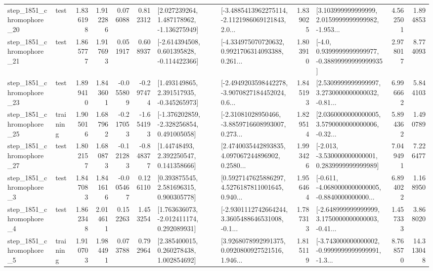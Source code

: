 \begin{tabular}{llrrrrllrlrr}
 step\_1851\_chromophore\_20 &      test &      1.836198 &    1.912286 &      0.076088 &  0.812312 &    [2.027239264, 1.487178962, -1.136275949] &  [-3.4885413962275114, -2.1121986069121843, 2.0... &       1.839025 &  [3.103999999999999, 2.0159999999999982, -1.953... &            4.562501 &          1.894853 \\
 step\_1851\_chromophore\_21 &      test &      1.865777 &    1.917693 &      0.051917 &  0.608937 &   [-2.614394508, 0.601395828, -0.114422366] &  [-4.334975070720632, 0.9921706314093388, 0.261... &       1.803910 &   [-4.0, 0.9399999999999977, -0.38899999999999935] &            2.978017 &          8.774093 \\
 step\_1851\_chromophore\_23 &      test &      1.899410 &    1.843601 &     -0.055809 & -0.297474 &    [1.493149865, 2.391517935, -0.345265973] &  [-2.4949203598442278, -3.9070827184452024, 0.6... &       1.845193 &  [2.5309999999999997, 3.2730000000000032, -0.81... &            6.996662 &          5.844103 \\
 step\_1851\_chromophore\_25 &  training &      1.905016 &    1.687962 &     -0.217053 & -1.654193 &   [-1.376202859, -2.328256854, 0.491005058] &  [-2.31081028950466, -3.8859716608993007, 0.273... &       1.829514 &  [2.0360000000000005, 3.5790000000000006, -0.32... &            5.894362 &          1.490789 \\
 step\_1851\_chromophore\_27 &      test &      1.802157 &    1.680873 &     -0.121283 & -0.848377 &      [1.44748493, 2.392250547, 0.141358666] &  [2.4740035442893835, 4.097067244896902, 0.2580... &       1.993426 &   [-2.013, -3.530000000000001, 0.2839999999999989] &            7.049491 &          7.226477 \\
  step\_1851\_chromophore\_3 &      test &      1.847083 &    1.841616 &     -0.005467 &  0.126110 &     [0.393875545, 2.581696315, 0.900305778] &  [0.5927147625886297, 4.5276187811001645, 0.940... &       1.956464 &  [-0.611, -4.0680000000000005, -0.8840000000000... &            6.894022 &          1.168950 \\
  step\_1851\_chromophore\_4 &      test &      1.862348 &    2.014611 &      0.152263 &  1.453254 &    [1.763636073, -2.012411174, 0.292089931] &  [-2.9301112742664244, 3.3605488646531008, -0.1... &       1.787313 &  [-2.648999999999999, 3.1750000000000003, -0.41... &            1.457333 &          3.868020 \\
  step\_1851\_chromophore\_5 &  training &      1.910703 &    1.984491 &      0.073788 &  0.792964 &     [2.385400015, 0.260278438, 1.002854692] &  [3.9268078992991375, 0.0920800927521516, 1.946... &       1.815119 &  [-3.743000000000002, -0.9999999999999991, -1.3... &            8.768570 &         14.313048 \\

\end{tabular}
